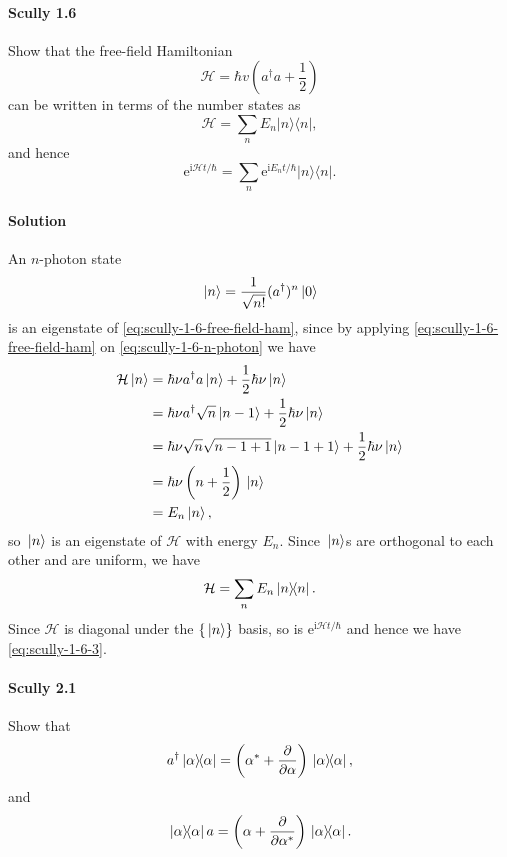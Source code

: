 \documentclass[hyperref, a4paper]{article}
\newcommand*{\ii}{\mathrm{i}}
\newcommand*{\ee}{\mathrm{e}}
\newcommand{\mathscr}{\mathcal}
\begin{document}
\paragraph{Scully 1.6} Show that the free-field Hamiltonian
\begin{equation}
    \mathscr{H}=\hbar v\left(a^{\dagger} a+\frac{1}{2}\right)
    \label{eq:scully-1-6-free-field-ham}
\end{equation}
can be written in terms of the number states as
\[
\mathscr{H}=\sum_{n} E_{n}|n\rangle\langle n|,
\]
and hence
\begin{equation}
    \ee^{\ii \mathscr{H} t / \hbar}=\sum_{n} \ee^{\ii E_{n} t / \hbar}|n\rangle\langle n|.
    \label{eq:scully-1-6-3}
\end{equation}

\paragraph{Solution} An $n$-photon state
\begin{equation}
    \ket*{n} = \frac{1}{\sqrt{n!}} (a^\dagger)^n \ket*{0}
    \label{eq:scully-1-6-n-photon}
\end{equation}
is an eigenstate of \eqref{eq:scully-1-6-free-field-ham}, since by applying \eqref{eq:scully-1-6-free-field-ham} on \eqref{eq:scully-1-6-n-photon} we have
\[
    \begin{aligned}
        \mathcal{H} \ket*{n} &= \hbar \nu a^\dagger a \ket*{n} + \frac{1}{2} \hbar \nu \ket*{n} \\
        &= \hbar \nu a^\dagger \sqrt{n} \ket*{n-1} + \frac{1}{2} \hbar \nu \ket*{n} \\
        &= \hbar \nu \sqrt{n} \sqrt{n-1+1} \ket*{n-1+1} + \frac{1}{2} \hbar \nu \ket*{n} \\
        &= \hbar \nu \left( n + \frac{1}{2} \right) \ket*{n} \\
        &= E_n \ket*{n},
    \end{aligned}
\]
so $\ket*{n}$ is an eigenstate of $\mathcal{H}$ with energy $E_n$.
Since $\ket*{n}$s are orthogonal to each other and are uniform, we have
\begin{equation}
    \mathcal{H} = \sum_n E_n \dyad*{n}.
\end{equation}
Since $\mathcal{H}$ is diagonal under the $\{\ket*{n}\}$ basis, so is $\ee^{\ii \mathcal{H} t / \hbar}$ and hence we have \eqref{eq:scully-1-6-3}.

\paragraph{Scully 2.1} Show that
\begin{equation}
    a^\dagger \dyad*{\alpha} = \left( \alpha^{*}+\frac{\partial}{\partial \alpha} \right) \dyad*{\alpha},
    \label{eq:scully-2-1-1}
\end{equation}
and
\begin{equation}
    \dyad*{\alpha} a = \left(\alpha+\frac{\partial}{\partial \alpha^{*}}\right) \dyad*{\alpha}.
    \label{eq:scully-2-1-2}
\end{equation}
\end{document}
